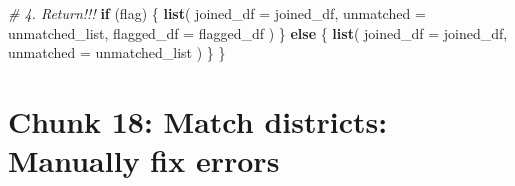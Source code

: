 \documentclass[
]{article}
\newenvironment{Shaded}{\begin{snugshade}}{\end{snugshade}}
\newcommand{\AttributeTok}[1]{\textcolor[rgb]{0.13,0.29,0.53}{#1}}
\newcommand{\CommentTok}[1]{\textcolor[rgb]{0.56,0.35,0.01}{\textit{#1}}}
\newcommand{\ControlFlowTok}[1]{\textcolor[rgb]{0.13,0.29,0.53}{\textbf{#1}}}
\newcommand{\FunctionTok}[1]{\textcolor[rgb]{0.13,0.29,0.53}{\textbf{#1}}}
\newcommand{\NormalTok}[1]{#1}
\begin{document}
\begin{Shaded}
\begin{Highlighting}[]
  \CommentTok{\# 4. Return!!!}
  \ControlFlowTok{if}\NormalTok{ (flag) \{}
    \FunctionTok{list}\NormalTok{(}
      \AttributeTok{joined\_df =}\NormalTok{ joined\_df,}
      \AttributeTok{unmatched =}\NormalTok{ unmatched\_list,}
      \AttributeTok{flagged\_df =}\NormalTok{ flagged\_df}
\NormalTok{    )}
\NormalTok{  \} }\ControlFlowTok{else}\NormalTok{ \{}
    \FunctionTok{list}\NormalTok{(}
      \AttributeTok{joined\_df =}\NormalTok{ joined\_df,}
      \AttributeTok{unmatched =}\NormalTok{ unmatched\_list}
\NormalTok{    )}
\NormalTok{  \}}
\NormalTok{\}}
\end{Highlighting}
\end{Shaded}

\section*{Chunk 18: Match districts: Manually fix errors}\label{chunk-18-match-districts-manually-fix-errors}
\end{document}
